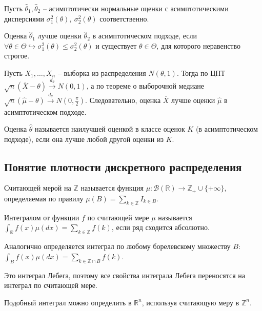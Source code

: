     Пусть $\displaystyle \hat{\theta }_{1} ,\hat{\theta }_{2}$ -- асимптотически нормальные оценки с асимптотическими дисперсиями $\displaystyle \sigma _{1}^{2}( \theta ) ,\ \sigma _{2}^{2}( \theta )$ соответственно.
    \begin{definition}
    Оценка $\displaystyle \hat{\theta }_{1}$ лучше оценки $\displaystyle \hat{\theta }_{2}$ в асимптотическом подходе, если $\displaystyle \forall \theta \in \Theta \hookrightarrow \sigma _{1}^{2}( \theta ) \leqslant \sigma _{2}^{2}( \theta )$ и существует $\displaystyle \theta \in \Theta $, для которого неравенство строгое.
    \end{definition}
    \begin{example}
    Пусть $\displaystyle X_{1} ,\dotsc ,X_{n}$ -- выборка из распределения $\displaystyle N( \theta ,1)$. Тогда по ЦПТ $\displaystyle \sqrt{n}(\overline{X} -\theta )\xrightarrow{d_{\theta }} N( 0,1)$, а по теореме о выборочной медиане $\displaystyle \sqrt{n}(\hat{\mu } -\theta )\xrightarrow{d_{\theta }} N\left( 0,\frac{\pi }{2}\right)$. Следовательно, оценка $\displaystyle \overline{X}$ лучше оценки $\displaystyle \hat{\mu }$ в асимптотическом подходе.
    \end{example}
    \begin{definition}
    Оценка $\displaystyle \hat{\theta }$ называется наилучшей оценкой в классе оценок $\displaystyle K$ (в асимптотическом подходе), если она лучше любой другой оценки из $\displaystyle K$.
    \end{definition}
    \subsection{Понятие плотности дискретного распределения}
    \begin{definition}
    Считающей мерой на $\displaystyle \mathbb{Z}$ называется функция $\displaystyle \mu :\mathcal{B}(\mathbb{R})\rightarrow \mathbb{Z}_{+} \cup \{+\infty \}$, определяемая по правилу $\displaystyle \mu ( B) =\sum _{k\in \mathbb{Z}} I_{k\in B}$.
    \end{definition}
    \begin{definition}
    Интегралом от функции $\displaystyle f$ по считающей мере $\displaystyle \mu $ называется $\displaystyle \int _{\mathbb{R}} f( x) \mu ( dx) =\sum _{k\in \mathbb{Z}} f( k)$, если ряд сходится абсолютно.
    \end{definition}
    Аналогично определяется интеграл по любому борелевскому множеству $\displaystyle B$: $\displaystyle \int _{B} f( x) \mu ( dx) =\sum _{k\in \mathbb{Z} \cap B} f( k)$.
    \begin{note}
    Это интеграл Лебега, поэтому все свойства интеграла Лебега переносятся на интеграл по считающей мере.
    \end{note}
    \begin{note}
    Подобный интеграл можно определить в $\displaystyle \mathbb{R}^{n}$, используя считающую меру в $\displaystyle \mathbb{Z}^{n}$.
    \end{note}